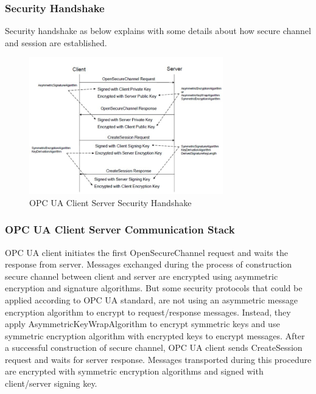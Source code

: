 \documentclass[]{llncs}
\begin{document}
\subsubsection{Security Handshake}
Security handshake as below explains with some details about how secure channel and session are established.
\begin{figure}[!htb]
	\centering
	\includegraphics[width=0.75\textwidth]{opc_ua_shs.jpg}
		\caption[ ]{OPC UA Client Server Security Handshake}
	\label{fig:opc_ua_cs_shs}
\end{figure}

\subsubsection{OPC UA Client Server Communication Stack}
OPC UA client initiates the first OpenSecureChannel request and waits the response from server. Messages exchanged during the process of construction secure channel between client and server are encrypted using asymmetric encryption and signature algorithms. But some security protocols that could be applied according to OPC UA standard, are not using an asymmetric message encryption algorithm to encrypt to request/response messages. Instead, they apply AsymmetricKeyWrapAlgorithm to encrypt symmetric keys and use symmetric encryption algorithm with encrypted keys to encrypt messages. After a successful construction of secure channel, OPC UA client sends CreateSession request and waits for server response. Messages transported during this procedure are encrypted with symmetric encryption algorithms and signed with client/server signing key.
\end{document}
